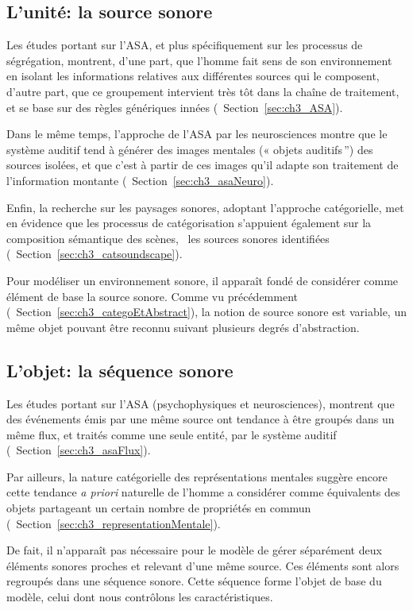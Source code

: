 \subsection{L'unité: la source sonore}

Les études portant sur l'ASA, et plus spécifiquement sur les processus de ségrégation, montrent, d'une part, que l'homme fait sens de son environnement en isolant les informations relatives aux différentes sources qui le composent, d'autre part, que ce groupement intervient très tôt dans la chaîne de traitement, et se base sur des règles génériques innées (\cf~Section~\ref{sec:ch3_ASA}).

Dans le même temps, l'approche de l'ASA par les neurosciences montre que le système auditif tend à générer des images mentales (« objets auditifs\,'') des sources isolées, et que c'est à partir de ces images qu'il adapte son traitement de l'information montante (\cf~Section~\ref{sec:ch3_asaNeuro}).

Enfin, la recherche sur les paysages sonores, adoptant l’approche catégorielle, met en évidence que les processus de catégorisation s'appuient également sur la composition sémantique des scènes, \ie~les sources sonores identifiées (\cf~Section~\ref{sec:ch3_catsoundscape}). 

Pour modéliser un environnement sonore, il apparaît fondé de considérer comme élément de base la source sonore. Comme vu précédemment (\cf~Section~\ref{sec:ch3_categoEtAbstract}), la notion de source sonore est variable, un même objet pouvant être reconnu suivant plusieurs degrés d'abstraction.

\subsection{L'objet: la séquence sonore}

Les études portant sur l'ASA (psychophysiques et neurosciences), montrent que des événements émis par une même source ont tendance à être groupés dans un même flux, et traités comme une seule entité, par le système auditif (\cf~Section~\ref{sec:ch3_asaFlux}).

Par ailleurs, la nature catégorielle des représentations mentales suggère encore cette tendance \emph{a priori} naturelle de l'homme a considérer comme équivalents des objets partageant un certain nombre de propriétés en commun (\cf~Section~\ref{sec:ch3_representationMentale}).

De fait, il n'apparaît pas nécessaire pour le modèle de gérer séparément deux éléments sonores proches et relevant d'une même source. Ces éléments sont alors regroupés dans une séquence sonore. Cette séquence forme l'objet de base du modèle, celui dont nous contrôlons les caractéristiques. 

